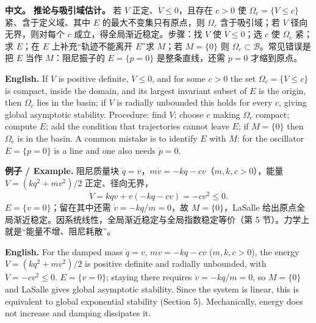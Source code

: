 \documentclass[UTF8,11pt,a4paper]{ctexart}
\newcommand{\EN}[1]{\par\noindent\textbf{English.} #1\par}
\newcommand{\EX}[2]{\par\noindent\textbf{例子 / Example.} #1\par\EN{#2}}
\newcommand{\APS}[2]{\par\noindent\textbf{中文。} #1\par\noindent\textbf{English.} #2\par}
\begin{document}
\APS{\textbf{推论与吸引域估计。} 若 $V$ 正定、$\dot V\le0$，且存在 $c>0$ 使 $\Omega_c=\{V\le c\}$ 紧、含于定义域、其中 $E$ 的最大不变集只有原点，则 $\Omega_c$ 含于吸引域；若 $V$ 径向无界，则对每个 $c$ 成立，得全局渐近稳定。步骤：找 $V$ 使 $\dot V\le0$；选 $c$ 使 $\Omega_c$ 紧；求 $E$；在 $E$ 上补充“轨迹不能离开 $E$”求 $M$；若 $M=\{0\}$ 则 $\Omega_c\subset\mathcal B$。常见错误是把 $E$ 当作 $M$：阻尼振子的 $E=\{p=0\}$ 是整条直线，还需 $\dot p=0$ 才缩到原点。}{If $V$ is positive definite, $\dot V\le0$, and for some $c>0$ the set $\Omega_c=\{V\le c\}$ is compact, inside the domain, and its largest invariant subset of $E$ is the origin, then $\Omega_c$ lies in the basin; if $V$ is radially unbounded this holds for every $c$, giving global asymptotic stability. Procedure: find $V$; choose $c$ making $\Omega_c$ compact; compute $E$; add the condition that trajectories cannot leave $E$; if $M=\{0\}$ then $\Omega_c$ is in the basin. A common mistake is to identify $E$ with $M$: for the oscillator $E=\{p=0\}$ is a line and one also needs $\dot p=0$.}

\EX{阻尼质量块 $\dot q=v$，$m\dot v=-kq-cv$（$m,k,c>0$），能量 $V=(kq^2+mv^2)/2$ 正定、径向无界，
\[
\dot V=kqv+v(-kq-cv)=-cv^2\le0 .
\]
$E=\{v=0\}$；留在其中还需 $\dot v=-kq/m=0$，故 $M=\{0\}$，LaSalle 给出原点全局渐近稳定。因系统线性，全局渐近稳定与全局指数稳定等价（第 5 节）。力学上就是“能量不增、阻尼耗散”。}{For the damped mass $\dot q=v$, $m\dot v=-kq-cv$ ($m,k,c>0$), the energy $V=(kq^2+mv^2)/2$ is positive definite and radially unbounded, with $\dot V=-cv^2\le0$. $E=\{v=0\}$; staying there requires $\dot v=-kq/m=0$, so $M=\{0\}$ and LaSalle gives global asymptotic stability. Since the system is linear, this is equivalent to global exponential stability (Section 5). Mechanically, energy does not increase and damping dissipates it.}
\end{document}
